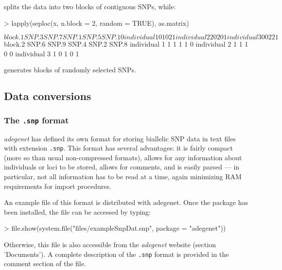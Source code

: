 \documentclass{article}
\begin{document}
splits the data into two blocks of contiguous SNPs, while:
\begin{Schunk}
\begin{Sinput}
> lapply(seploc(x, n.block = 2, random = TRUE), as.matrix)
\end{Sinput}
\begin{Soutput}
$block.1
             SNP.3 SNP.7 SNP.1 SNP.5 SNP.10
individual 1     0     1     0     2      1
individual 2     2     0     2     0      1
individual 3     0     0     2     2      1

$block.2
             SNP.6 SNP.9 SNP.4 SNP.2 SNP.8
individual 1     1     1     1     1     0
individual 2     1     1     1     0     0
individual 3     1     0     1     0     1
\end{Soutput}
\end{Schunk}
generates blocks of randomly selected SNPs.




\subsection{Data conversions}

\subsubsection{The \texttt{.snp} format}

\textit{adegenet} has defined its own format for storing biallelic SNP data in text files with
extension \texttt{.snp}.
This format has several advantages: it is fairly compact (more so than usual non-compressed
formats), allows for any information about individuals or loci to be stored, allows for comments,
and is easily parsed --- in particular, not all information has to be read at a time, again
minimizing RAM requirements for import procedures.


An example file of this format is distributed with adegenet.
Once the package has been installed, the file can be accessed by typing:
\begin{Schunk}
\begin{Sinput}
> file.show(system.file("files/exampleSnpDat.snp", package = "adegenet"))
\end{Sinput}
\end{Schunk}
Otherwise, this file is also accessible from the \textit{adegenet} website (section 'Documents').
A complete description of the \texttt{.snp} format is provided in the comment section of the file.
\\
\end{document}
